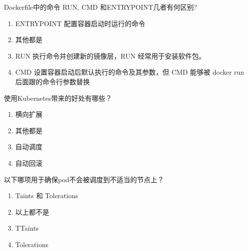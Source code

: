 \begin{problem}
	Dockerfile中的命令 RUN, CMD 和ENTRYPOINT几者有何区别?
        \begin{enumerate}[label=\Alph*.]
            \item ENTRYPOINT 配置容器启动时运行的命令
            \item 其他都是
            \item RUN 执行命令并创建新的镜像层，RUN 经常用于安装软件包。
            \item CMD 设置容器启动后默认执行的命令及其参数，但 CMD 能够被 docker run 后面跟的命令行参数替换
        \end{enumerate}
\end{problem}



\begin{problem}
	使用Kubernetes带来的好处有哪些？
    \vspace{-0.8em}
    \begin{multicols}{4}
        \begin{enumerate}[label=\Alph*.]
            \item 横向扩展
            \item 其他都是
            \item 自动调度
            \item 自动回滚
        \end{enumerate}
    \end{multicols}
    \vspace{-1em}
\end{problem}



\begin{problem}
	以下哪项用于确保pod不会被调度到不适当的节点上？
    \vspace{-0.8em}
    \begin{multicols}{2}
        \begin{enumerate}[label=\Alph*.]
            \item Taints 和 Tolerations
            \item 以上都不是
            \item TTaints
            \item Tolerations
        \end{enumerate}
    \end{multicols}
    \vspace{-1em}
\end{problem}



